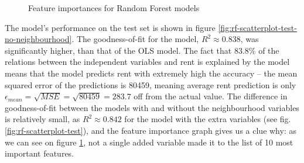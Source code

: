 \documentclass[12pt]{report}
\begin{document}
\begin{figure}[ht]
	\caption{Feature importances for Random Forest models}
	\label{fig:rf-importances}
\end{figure}

The model's performance on the test set is shown in figure \ref{fig:rf-scatterplot-test-no-neighbourhood}. The goodness-of-fit for the model, $R^2\approx0.838$, was significantly higher, than that of the OLS model. The fact that 83.8\% of the relations between the independent variables and rent is explained by the model means that the model predicts rent with extremely high the accuracy -- the mean squared error of the predictions is 80459, meaning average rent prediction is only $\epsilon_{mean}=\sqrt{MSE}=\sqrt{80459}=283.7$ off from the actual value. The difference in goodness-of-fit between the models with and without the neighbourhood variables is relatively small, as $R^2\approx0.842$ for the model with the extra variables (see fig. \ref{fig:rf-scatterplot-test}), and the feature importance graph gives us a clue why: as we can see on figure \ref{fig:rf-importances}, not a single added variable made it to the list of 10 most important features.
\end{document}
